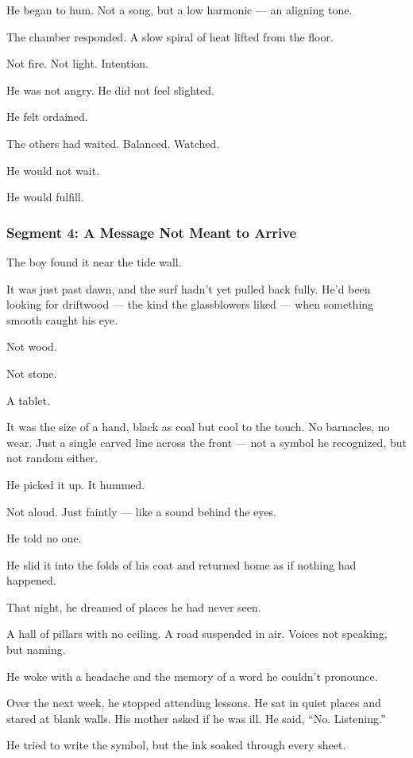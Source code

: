 \documentclass[9pt]{article}
\begin{document}
He began to hum. Not a song, but a low harmonic — an aligning tone.

The chamber responded. A slow spiral of heat lifted from the floor.

Not fire. Not light. Intention.

He was not angry. He did not feel slighted.

He felt ordained.

The others had waited. Balanced. Watched.

He would not wait.

He would fulfill.


\newpage

\subsubsection*{Segment 4: A Message Not Meant to Arrive}

The boy found it near the tide wall.

It was just past dawn, and the surf hadn’t yet pulled back fully. He’d been looking for driftwood — the kind the glassblowers liked — when something smooth caught his eye.

Not wood.

Not stone.

A tablet.

It was the size of a hand, black as coal but cool to the touch. No barnacles, no wear. Just a single carved line across the front — not a symbol he recognized, but not random either.

He picked it up. It hummed.

Not aloud. Just faintly — like a sound behind the eyes.

He told no one.

He slid it into the folds of his coat and returned home as if nothing had happened.

That night, he dreamed of places he had never seen.

A hall of pillars with no ceiling. A road suspended in air. Voices not speaking, but naming.

He woke with a headache and the memory of a word he couldn’t pronounce.

Over the next week, he stopped attending lessons. He sat in quiet places and stared at blank walls. His mother asked if he was ill. He said, ``No. Listening.''

He tried to write the symbol, but the ink soaked through every sheet.
\end{document}
